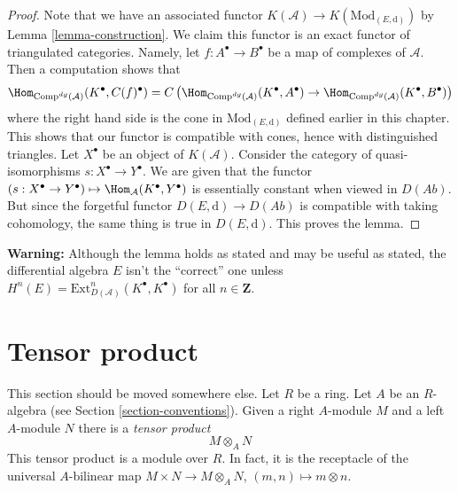 \begin{proof}
Note that we have an associated functor
$K(\mathcal{A}) \to K(\text{Mod}_{(E, \text{d})})$ by
Lemma \ref{lemma-construction}.
We claim this functor is an exact functor of triangulated categories.
Namely, let $f : A^\bullet \to B^\bullet$ be a map of complexes
of $\mathcal{A}$. Then a computation shows that
$$
\Hom_{\text{Comp}^{dg}(\mathcal{A})}(K^\bullet, C(f)^\bullet)
=
C\left(
\Hom_{\text{Comp}^{dg}(\mathcal{A})}(K^\bullet, A^\bullet) \to
\Hom_{\text{Comp}^{dg}(\mathcal{A})}(K^\bullet, B^\bullet)
\right)
$$
where the right hand side is the cone in $\text{Mod}_{(E, \text{d})}$
defined earlier in this chapter.
This shows that our functor is compatible with cones, hence with
distinguished triangles. Let $X^\bullet$ be an object of $K(\mathcal{A})$.
Consider the category of quasi-isomorphisms $s : X^\bullet \to Y^\bullet$.
We are given that the functor
$(s : X^\bullet \to Y^\bullet) \mapsto \Hom_\mathcal{A}(K^\bullet, Y^\bullet)$
is essentially constant when viewed in $D(\textit{Ab})$.
But since the forgetful functor $D(E, \text{d}) \to D(\textit{Ab})$
is compatible with taking cohomology, the same thing is true in
$D(E, \text{d})$. This proves the lemma.
\end{proof}

\noindent
{\bf Warning:} Although the lemma holds as stated and may be useful
as stated, the differential algebra $E$ isn't the ``correct'' one unless
$H^n(E) = \text{Ext}^n_{D(\mathcal{A})}(K^\bullet, K^\bullet)$
for all $n \in \mathbf{Z}$.




\section{Tensor product}
\label{section-tensor-product}

\noindent
This section should be moved somewhere else. Let $R$ be a ring.
Let $A$ be an $R$-algebra (see Section \ref{section-conventions}).
Given a right $A$-module $M$ and a left $A$-module $N$ there is
a {\it tensor product}
$$
M \otimes_A N
$$
This tensor product is a module over $R$. In fact, it is the receptacle
of the universal $A$-bilinear map $M \times N \to M \otimes_A N$,
$(m, n) \mapsto m \otimes n$.


